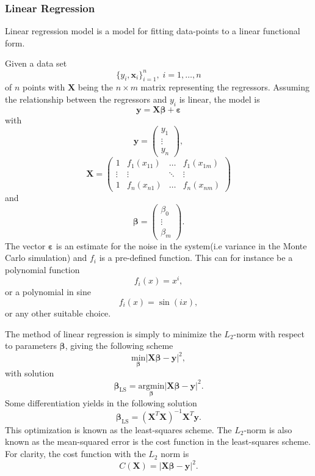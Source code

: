 \documentclass[10pt, t]{beamer}
\begin{document}
\hypertarget{linear-regression}{%
\subsubsection{Linear Regression}\label{linear-regression}}

Linear regression model is a model for fitting data-points to a linear
functional form.

Given a data set \[\{y_i, \boldsymbol{x}_i\}_{i=1}^n,\; i=1,\dots,n\] of
\(n\) points with \(\boldsymbol{X}\) being the \(n\times m\) matrix
representing the regressors. Assuming the relationship between the
regressors and \(y_i\) is linear, the model is
\[\boldsymbol{y} = \boldsymbol{X}\boldsymbol{\beta} + \boldsymbol{\varepsilon}\]
with \[
    \boldsymbol{y} =
        \begin{pmatrix}
            y_1 \\
            \vdots \\
            y_n
        \end{pmatrix},
    \] \[
    \boldsymbol{X} =
        \begin{pmatrix}
            1 & f_1\left(x_{11}\right) & \dots & f_1\left(x_{1m}\right) \\
            \vdots & \vdots & \ddots & \vdots \\
            1 & f_n\left(x_{n1}\right) & \dots & f_n\left(x_{nm}\right)
        \end{pmatrix}
    \] and \[
    \boldsymbol{\beta} = 
        \begin{pmatrix}
            \beta_0 \\
            \vdots \\
            \beta_m
        \end{pmatrix}.
    \] The vector \(\boldsymbol{\varepsilon}\) is an estimate for the
noise in the system(i.e variance in the Monte Carlo simulation) and
\(f_i\) is a pre-defined function. This can for instance be a polynomial
function \[f_i(x) = x^i,\] or a polynomial in sine
\[f_i(x) = \sin(ix),\] or any other suitable choice.

The method of linear regression is simply to minimize the \(L_2\)-norm
with respect to parameters \(\boldsymbol{\beta}\), giving the following
scheme
\[\underset{\boldsymbol{\beta}}{\text{min}}{\big|}\boldsymbol{X}\boldsymbol{\beta} - \boldsymbol{y}{\big|}^2,\]
with solution
\[\boldsymbol{\beta}_{\text{LS}} = \underset{\boldsymbol{\beta}}{\text{arg}\text{min}}{\big|}\boldsymbol{X}\boldsymbol{\beta} - \boldsymbol{y}{\big|}^2.\]
Some differentiation yields in the following solution
\[\boldsymbol{\beta}_{\text{LS}} = \left(\boldsymbol{X}^T\boldsymbol{X}\right)^{-1}\boldsymbol{X}^T\boldsymbol{y}.\]
This optimization is known as the least-squares scheme. The \(L_2\)-norm
is also known as the mean-squared error is the cost function in the
least-squares scheme. For clarity, the cost function with the \(L_2\)
norm is
\[C(\boldsymbol{X}) = \left|\boldsymbol{X}\boldsymbol{\beta} - \boldsymbol{y}\right|^2.\]
\end{document}
